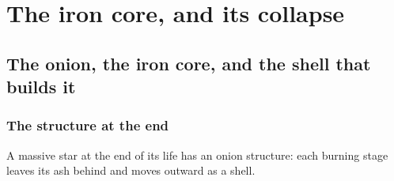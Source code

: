 %

\section{The iron core, and its collapse}
\label{part:collapse}

\subsection{The onion, the iron core, and the shell that builds it}
\label{sec:ironcore}

\subsubsection{The structure at the end}
\label{sec:onion}

A massive star at the end of its life has an onion structure: each burning
stage leaves its ash behind and moves outward as a shell.

